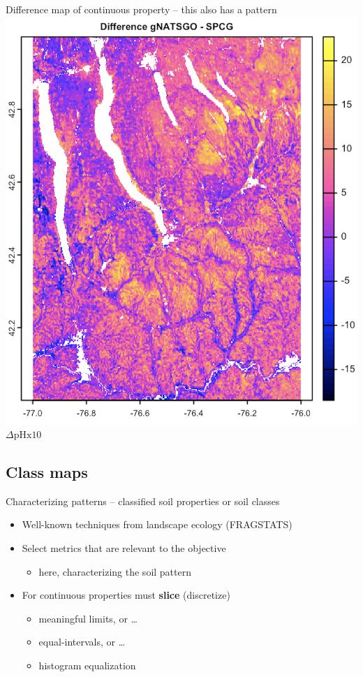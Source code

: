 \documentclass[aspectratio=169]{beamer}
\begin{document}
\begin{frame}{Difference map of continuous property -- this also has a pattern}
        \centering        \includegraphics[height=0.72\textheight]  {graphics_david/Delta_gNATSGO_SG_ph05.png}
\\
$\Delta \mathrm{pH x 10}$
\end{frame}


\subsection{Class maps}

\begin{frame}{Characterizing patterns -- classified soil properties or soil classes}
\begin{itemize}
    \item Well-known techniques from landscape ecology (FRAGSTATS)
    \item Select metrics that are relevant to the objective
    \begin{itemize}
        \item here, characterizing the soil pattern
    \end{itemize}
    \item For continuous properties must \textbf{slice} (discretize)
    \begin{itemize}
        \item meaningful limits, or \ldots
        \item equal-intervals, or \ldots
        \item histogram equalization
    \end{itemize}
\end{itemize}
\end{frame}
\end{document}
